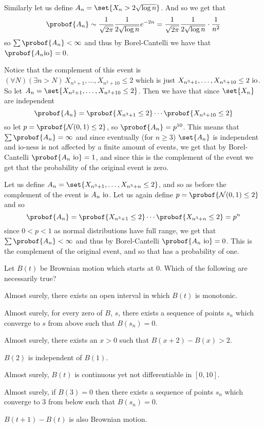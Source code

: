     \item Similarly let us define $A_n=\set{X_n>2\sqrt{\log n}}$.
    And so we get that
    $$ \probof{A_n}\sim\frac1{\sqrt{2\pi}}\frac1{2\sqrt{\log n}}e^{-2n} = \frac1{\sqrt{2\pi}}\frac1{2\sqrt{\log n}}\cdot\frac1{n^2} $$
    so $\sum\probof{A_n}<\infty$ and thus by Borel-Cantelli we have that $\probof{A_n\hbox {io}}=0$.

    \item Notice that the complement of this event is $(\forall N)(\exists n>N)\,X_{n^3+1},\dots,X_{n^3+10}\leq2$ which is just $X_{n^3+1},\dots,X_{n^3+10}\leq2\hbox{ io}$.
    So let $A_n=\set{X_{n^3+1},\dots,X_{n^3+10}\leq2}$.
    Then we have that since $\set{X_n}$ are independent
    $$ \probof{A_n} = \probof{X_{n^3+1}\leq2}\cdots\probof{X_{n^3+10}\leq2} $$
    so let $p=\probof{{\cal N}(0,1)\leq2}$, so $\probof{A_n}=p^{10}$.
    This means that $\sum\probof{A_n}=\infty$ and since eventually (for $n\geq3$) $\set{A_n}$ is independent and io-ness is not affected by a finite amount of events, we get that by Borel-Cantelli
    $\probof{A_n\hbox{ io}}=1$, and since this is the complement of the event we get that the probability of the original event is zero.

    \item Let us define $A_n=\set{X_{n^3+1},\dots,X_{n^3+n}\leq2}$, and so as before the complement of the event is $A_n\hbox{ io}$.
    Let us again define $p=\probof{{\cal N}(0,1)\leq2}$ and so
    $$ \probof{A_n} = \probof{X_{n^3+1}\leq2}\cdots\probof{X_{n^3+n}\leq2} = p^n $$
    since $0<p<1$ as normal distributions have full range, we get that $\sum\probof{A_n}<\infty$ and thus by Borel-Cantelli $\probof{A_n\hbox{ io}}=0$.
    This is the complement of the original event, and so that has a probability of one.
\eenum

\bexerc

    Let $B(t)$ be Brownian motion which starts at $0$.
    Which of the following are necessarily true?
    \benum
        \item Almost surely, there exists an open interval in which $B(t)$ is monotonic.
        \item Almost surely, for every zero of $B$, $s$, there exists a sequence of points $s_n$ which converge to $s$ from above such that $B(s_n)=0$.
        \item Almost surely, there exists an $x>0$ such that $B(x+2)-B(x)>2$.
        \item $B(2)$ is independent of $B(1)$.
        \item Almost surely, $B(t)$ is continuous yet not differentiable in $[0,10]$.
        \item Almost surely, if $B(3)=0$ then there exists a sequence of points $s_n$ which converge to $3$ from below such that $B(s_n)=0$.
        \item $B(t+1)-B(t)$ is also Brownian motion.
    \eenum

